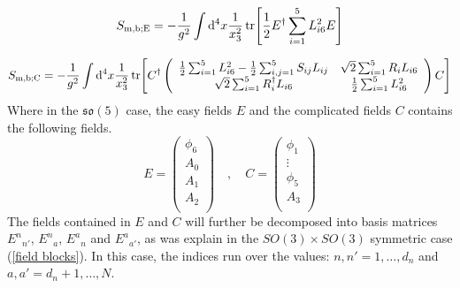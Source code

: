 %
%
\begin{equation}\label{easy boson mass action so(5)}
S_{\text{m,b;E}} = -\frac{1}{g^2} \int \mathrm{d}^4 x \frac{1}{x_3^2} \tr[
\frac{1}{2} E^\dagger \sum_{i=1}^5 L_{i6}^2 E
]
\end{equation}
%
%

%
%
\begin{equation}\label{complicated boson mass action so(5)}
S_{\text{m,b;C}} = -\frac{1}{g^2} \int \mathrm{d}^4 x \frac{1}{x_3^2} \tr[
C^\dagger
\left( \begin{array}{cc}
\frac{1}{2} \sum_{i=1}^5 L_{i6}^2 - \frac{1}{2} \sum_{i,j=1}^5 S_{ij} L_{ij} & \sqrt{2} \sum_{i=1}^5 R_i L_{i6} \\
\sqrt{2} \sum_{i=1}^5 R_i^\dagger L_{i6} & \frac{1}{2} \sum_{i=1}^5 L_{i6}^2 \\
\end{array} \right) C
]
\end{equation}
%
%
Where in the $\mathfrak{so}(5)$ case, the easy fields $E$ and the complicated fields $C$ contains the following fields.
%
%
\begin{equation}
E = \left( \begin{array}{c}
\phi_6 \\
A_0 \\
A_1 \\
A_2 \\
\end{array} \right)
%
\quad , \quad
%
C = \left( \begin{array}{c}
\phi_1 \\
\vdots \\
\phi_5 \\
A_3 \\
\end{array} \right)
\end{equation}
%
%
The fields contained in $E$ and $C$ will further be decomposed into basis matrices ${E^{n}}_{n'}$, ${E^{n}}_{a}$, ${E^{a}}_{n}$ and ${E^{a}}_{a'}$, as was explain in the $SO(3) \times SO(3)$ symmetric case (\ref{field blocks}). In this case, the indices run over the values: $n,n' = 1, \ldots , d_n$ and $a,a' = d_n + 1, \ldots , N$.

